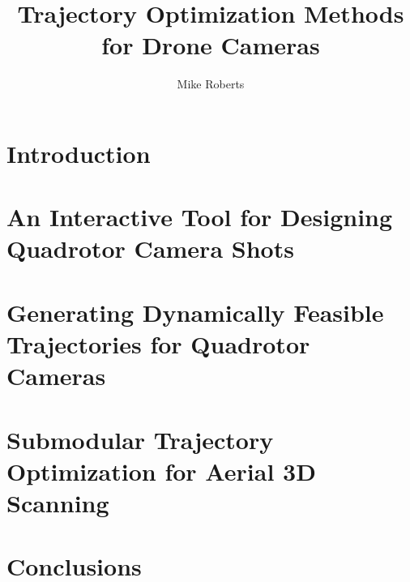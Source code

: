\documentclass{report}
\begin{document}
\newcommand{\shortcite}[1]{\cite{#1}}

\title{Trajectory Optimization Methods for Drone Cameras}
\author{Mike Roberts}

\beforepreface




\afterpreface

\chapter{Introduction}



\chapter{An Interactive Tool for Designing Quadrotor Camera Shots}















\chapter{Generating Dynamically Feasible Trajectories for Quadrotor Cameras}










\chapter{Submodular Trajectory Optimization for Aerial 3D Scanning}









\chapter{Conclusions}



\appendix





\end{document}
